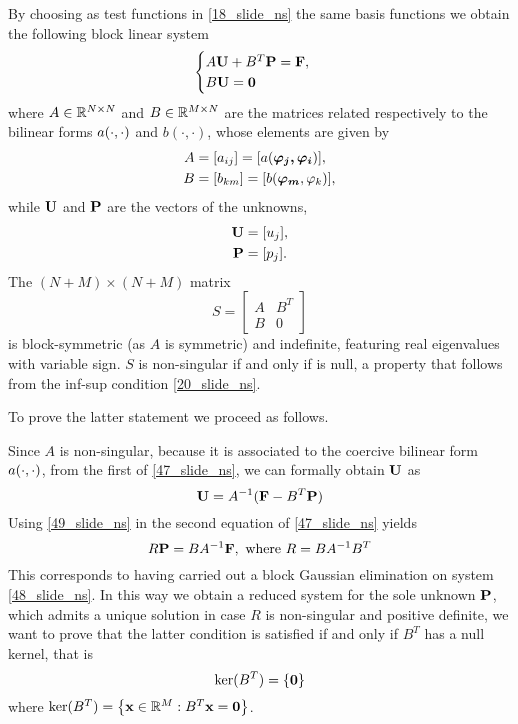 By choosing as test functions in \eqref{18_slide_ns} the same basis functions we obtain the following block linear system 
\begin{equation}
    \begin{cases}
        A\textbf{U} + B^T \textbf{P} = \textbf{F}, \\
        B\textbf{U} = \textbf{0}
    \end{cases}
    \label{47_slide_ns}
\end{equation}
where \(A \in \mathbb{R}^{N\times N}\) and \(B \in \mathbb{R}^{M \times N}\) are the matrices related respectively to the bilinear forms \(a(\cdot, \cdot)\) and \(b(\cdot, \cdot)\), whose elements are given by 
\begin{align*}
    A &= [a_{ij}] = [a(\bm{\phi_j, \phi_i})], \\
    B &= [b_{km}] = [b(\bm{\phi_m}, \oldphi_k)],
\end{align*}
while \(\textbf{U}\) and \(\textbf{P}\) are the vectors of the unknowns, 
\begin{align*}
    \textbf{U} &= [u_j], \\
    \textbf{P} &= [p_j].
\end{align*}
The \((N+M) \times (N+M)\) matrix 
\begin{equation}
    S = \left[ \begin{matrix}
        A & B^T \\ B & 0
    \end{matrix} \right]
    \label{48_slide_ns}
\end{equation}
is block-symmetric (as \(A\) is symmetric) and indefinite, featuring real eigenvalues with variable sign. \(S\) is non-singular if and only if is null, a property that follows from the inf-sup condition \eqref{20_slide_ns}.

To prove the latter statement we proceed as follows. 

Since \(A\) is non-singular, because it is associated to the coercive bilinear form \(a(\cdot, \cdot)\), from the first of \eqref{47_slide_ns}, we can formally obtain \(\textbf{U}\) as 
\begin{equation}
    \textbf{U} = A^{-1}(\textbf{F} - B^T\textbf{P})
    \label{49_slide_ns}
\end{equation}
Using \eqref{49_slide_ns} in the second equation of \eqref{47_slide_ns} yields
\begin{equation}
    R\textbf{P} = BA^{-1}\textbf{F}, \text{ where } R=BA^{-1}B^T 
    \label{50_slide_ns}
\end{equation}
This corresponds to having carried out a block Gaussian elimination on system \eqref{48_slide_ns}.
In this way we obtain a reduced system for the sole unknown \(\textbf{P}\), which admits a unique solution in case \(R\) is non-singular and positive definite, we want to prove that the latter condition is satisfied if and only if \(B^T\) has a null kernel, that is 
\begin{equation}
    \ker (B^T) = \left\{ \textbf{0} \right\}
    \label{51_slide_ns}
\end{equation}
where \(\ker (B^T) = \left\{ \textbf{x} \in \mathbb{R}^M : B^T \textbf{x} = \textbf{0} \right\}\). 

